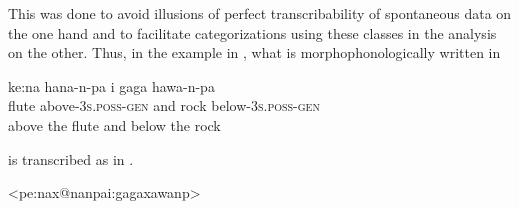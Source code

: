 \documentclass[output=paper]{LSP/langsci}
\begin{document}

This was done to avoid illusions of perfect  transcribability of spontaneous data on the one hand and to facilitate categorizations using these classes in the analysis on the other. Thus, in the example in , what is morphophonologically written in 

\ea
\label{ex:buc:6}
\gll ke\textipa:na hana-n-pa i  gaga hawa-n-pa\\
flute above-\textsc{3s}.\textsc{poss}-\textsc{gen} and rock below-\textsc{3s}.\textsc{poss}-\textsc{gen}\\
\glt above the flute and below the rock
\z

\noindent is transcribed as in .

\ea
\label{ex:buc:7}
\ttfamily  <pe\textipa:{\textbar}na{\textbar}x@{\textbar}nan{\textbar}pa{\textbar}i\textipa:{\textbar}ga{\textbar}ga{\textbar}xa{\textbar}wanp>
\z
\end{document}
